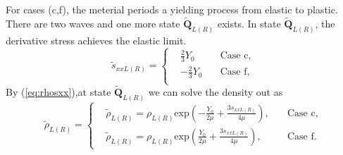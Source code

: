 \documentclass[review]{elsarticle}
\begin{document}
For cases (c,f), the meterial periods a yielding process from elastic to plastic. There are two waves and  one more state $\tilde{\mathbf{Q}}_{L(R)}$ exists. In state $\tilde{\mathbf{Q}}_{L(R)}$, the derivative stress achieves the elastic limit. 
\begin{equation}
 \tilde{s}_{xxL(R)} = \left\{ \begin{align}
	  &\frac{2}{3}Y_0 \quad  &\text{Case c},\\
	  &-\frac{2}{3}Y_0 \quad &\text{Case f},\\
	\end{align}
  \right.
\end{equation}
By (\ref{eq:rhosxx}),at state $\tilde{\mathbf{Q}}_{L(R)}$ we can solve the density out as 
\begin{equation}
  \tilde{\rho}_{L(R)}= \left\{ \begin{align}
	  &\widetilde{\rho}_{L(R)} = \rho_{L(R)} \text{exp}\left(-\frac{Y_0}{2\mu}+\frac{3 s_{xxL(R)}}{4\mu}\right), \quad  & \text{Case c}, \\ 
	  &\widetilde{\rho}_{L(R)} = \rho_{L(R)} \text{exp}\left(\frac{Y_0}{2\mu}+\frac{3 s_{xxL(R)}}{4\mu}\right), \quad  & \text{Case f}. 
	\end{align}
  \right.
	\end{equation}
\end{document}
